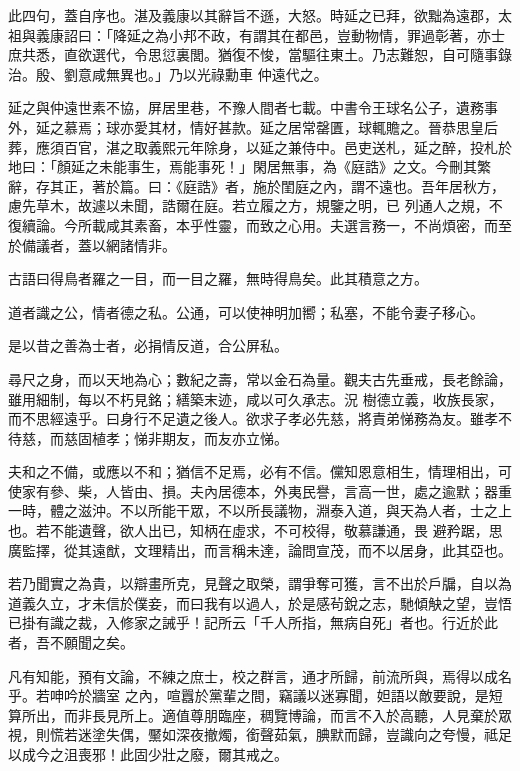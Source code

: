 \begin{pinyinscope}
 此四句，蓋自序也。湛及義康以其辭旨不遜，大怒。時延之已拜，欲黜為遠郡，太祖與義康詔曰：「降延之為小邦不政，有謂其在都邑，豈動物情，罪過彰著，亦士庶共悉，直欲選代，令思愆裏閭。猶復不悛，當驅往東土。乃志難恕，自可隨事錄治。殷、劉意咸無異也。」乃以光祿勳車
 仲遠代之。



 延之與仲遠世素不協，屏居里巷，不豫人間者七載。中書令王球名公子，遺務事外，延之慕焉；球亦愛其材，情好甚款。延之居常罄匱，球輒贍之。晉恭思皇后葬，應須百官，湛之取義熙元年除身，以延之兼侍中。邑吏送札，延之醉，投札於地曰：「顏延之未能事生，焉能事死！」閑居無事，為《庭誥》之文。今刪其繁辭，存其正，著於篇。曰：《庭誥》者，施於閨庭之內，謂不遠也。吾年居秋方，慮先草木，故遽以未聞，誥爾在庭。若立履之方，規鑒之明，已
 列通人之規，不復續論。今所載咸其素畜，本乎性靈，而致之心用。夫選言務一，不尚煩密，而至於備議者，蓋以網諸情非。



 古語曰得鳥者羅之一目，而一目之羅，無時得鳥矣。此其積意之方。



 道者識之公，情者德之私。公通，可以使神明加嚮；私塞，不能令妻子移心。



 是以昔之善為士者，必捐情反道，合公屏私。



 尋尺之身，而以天地為心；數紀之壽，常以金石為量。觀夫古先垂戒，長老餘論，雖用細制，每以不朽見銘；繕築末迹，咸以可久承志。況
 樹德立義，收族長家，而不思經遠乎。曰身行不足遺之後人。欲求子孝必先慈，將責弟悌務為友。雖孝不待慈，而慈固植孝；悌非期友，而友亦立悌。



 夫和之不備，或應以不和；猶信不足焉，必有不信。儻知恩意相生，情理相出，可使家有參、柴，人皆由、損。夫內居德本，外夷民譽，言高一世，處之逾默；器重一時，體之滋沖。不以所能干眾，不以所長議物，淵泰入道，與天為人者，士之上也。若不能遺聲，欲人出已，知柄在虛求，不可校得，敬慕謙通，畏
 避矜踞，思廣監擇，從其遠猷，文理精出，而言稱未達，論問宣茂，而不以居身，此其亞也。



 若乃聞實之為貴，以辯畫所克，見聲之取榮，謂爭奪可獲，言不出於戶牖，自以為道義久立，才未信於僕妾，而曰我有以過人，於是感茍銳之志，馳傾觖之望，豈悟已掛有識之裁，入修家之誡乎！記所云「千人所指，無病自死」者也。行近於此者，吾不願聞之矣。



 凡有知能，預有文論，不練之庶士，校之群言，通才所歸，前流所與，焉得以成名乎。若呻吟於牆室
 之內，喧囂於黨輩之間，竊議以迷寡聞，妲語以敵要說，是短算所出，而非長見所上。適值尊朋臨座，稠覽博論，而言不入於高聽，人見棄於眾視，則慌若迷塗失偶，黶如深夜撤燭，銜聲茹氣，腆默而歸，豈識向之夸慢，祗足以成今之沮喪邪！此固少壯之廢，爾其戒之。




\end{pinyinscope}
